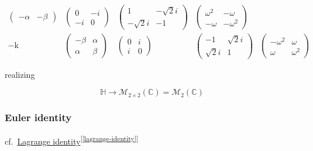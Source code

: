 \documentclass[
]{book}
\theoremstyle{definition}
\theoremstyle{definition}
\theoremstyle{definition}
\theoremstyle{definition}
\theoremstyle{remark}
\begin{document}
\[\begin{array}{ccccc}
\begin{pmatrix}
-\alpha & -\beta
\end{pmatrix} & \begin{pmatrix}0 & -i\\
-i & 0
\end{pmatrix} & \begin{pmatrix}1 & -\sqrt{2}i\\
-\sqrt{2}i & -1
\end{pmatrix} & \begin{pmatrix}\omega^{2} & -\omega\\
-\omega & -\omega^{2}
\end{pmatrix}\\
-\mathrm{k} & \begin{pmatrix}-\beta & \alpha\\
\alpha & \beta
\end{pmatrix} & \begin{pmatrix}0 & i\\
i & 0
\end{pmatrix} & \begin{pmatrix}-1 & \sqrt{2}i\\
\sqrt{2}i & 1
\end{pmatrix} & \begin{pmatrix}-\omega^{2} & \omega\\
\omega & \omega^{2}
\end{pmatrix}
\end{array}
\]

realizing

\[
\mathbb{H}\rightarrow\mathcal{M}_{2\times2}\left(\mathbb{C}\right)=\mathcal{M}_{2}\left(\mathbb{C}\right)
\]

\hypertarget{euler-identity}{%
\subsubsection{Euler identity}\label{euler-identity}}

cf.~\protect\hyperlink{lagrange-identity}{Lagrange identity}\textsuperscript{{[}\ref{lagrange-identity}{]}}
\end{document}

